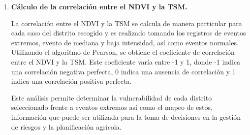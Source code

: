 \begin{enumerate}[label=\thesubsection.\arabic*, leftmargin=1.5cm]
      Esta información ayuda a poder entender el comportamiento del NDVI en dichas zonas a lo largo de los años, lo que permite identificar patrones y tendencias en el comportamiento del NDVI frente a las anomalías térmicas en la TSM. Esta información es útil para la toma de decisiones en la gestión de riesgos y la planificación agrícola.
      
      \item \textbf{Cálculo de la correlación entre el NDVI y la TSM.}
      
      La correlación entre el NDVI y la TSM se calcula de manera particular para cada caso del distrito escogido y es realizado tomando los registros de eventos extremos, evento de mediana y baja intensidad, así como eventos normales. Utilizando el algoritmo de Pearson, se obtiene el coeficiente de correlación entre el NDVI y la TSM. Este coeficiente varía entre -1 y 1, donde -1 indica una correlación negativa perfecta, 0 indica una ausencia de correlación y 1 indica una correlación positiva perfecta. 

      Este análisis permite determinar la vulnerabilidad de cada distrito seleccionado frente a eventos extremos así como el mapeo de estos, información que puede ser utilizada para la toma de decisiones en la gestión de riesgos y la planificación agrícola.
      
      

    \end{enumerate}